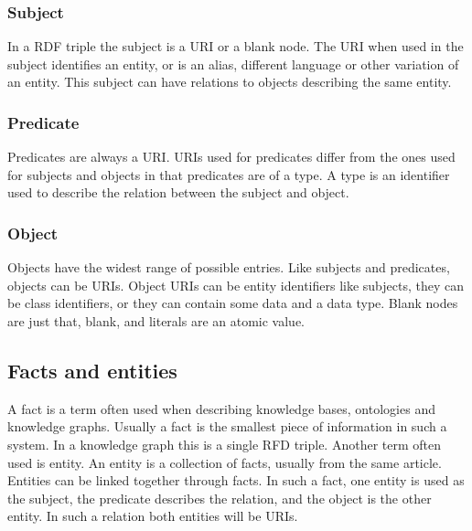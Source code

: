 \subsubsection{Subject}
In a RDF triple the subject is a URI or a blank node. The URI when used in the subject identifies an entity, or is an alias, different language or other variation of an entity. This subject can have relations to objects describing the same entity.

\subsubsection{Predicate}
Predicates are always a URI. URIs used for predicates differ from the ones used for subjects and objects in that predicates are of a type. A type is an identifier used to describe the relation between the subject and object.

\subsubsection{Object}
Objects have the widest range of possible entries. Like subjects and predicates, objects can be URIs. Object URIs can be entity identifiers like subjects, they can be class identifiers, or they can contain some data and a data type. Blank nodes are just that, blank, and literals are an atomic value. 

\subsection{Facts and entities}
A fact is a term often used when describing knowledge bases, ontologies and knowledge graphs. Usually a fact is the smallest piece of information in such a system. In a knowledge graph this is a single RFD triple. Another term often used is entity. An entity is a collection of facts, usually from the same article. Entities can be linked together through facts. In such a fact, one entity is used as the subject, the predicate describes the relation, and the object is the other entity. In such a relation both entities will be URIs.









